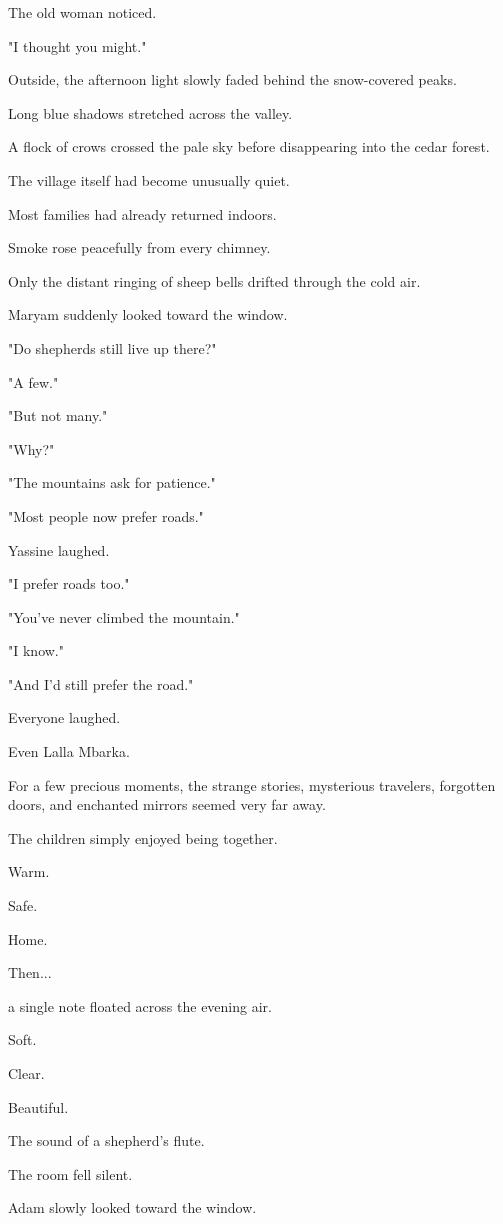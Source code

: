\documentclass[12pt,openany]{book}
\begin{document}
The old woman noticed.

"I thought you might."

Outside, the afternoon light slowly faded behind the snow-covered peaks.

Long blue shadows stretched across the valley.

A flock of crows crossed the pale sky before disappearing into the cedar forest.

The village itself had become unusually quiet.

Most families had already returned indoors.

Smoke rose peacefully from every chimney.

Only the distant ringing of sheep bells drifted through the cold air.

Maryam suddenly looked toward the window.

"Do shepherds still live up there?"

"A few."

"But not many."

"Why?"

"The mountains ask for patience."

"Most people now prefer roads."

Yassine laughed.

"I prefer roads too."

"You've never climbed the mountain."

"I know."

"And I'd still prefer the road."

Everyone laughed.

Even Lalla Mbarka.

For a few precious moments, the strange stories, mysterious travelers, forgotten doors, and enchanted mirrors seemed very far away.

The children simply enjoyed being together.

Warm.

Safe.

Home.

Then...

a single note floated across the evening air.

Soft.

Clear.

Beautiful.

The sound of a shepherd's flute.

The room fell silent.

Adam slowly looked toward the window.
\end{document}
